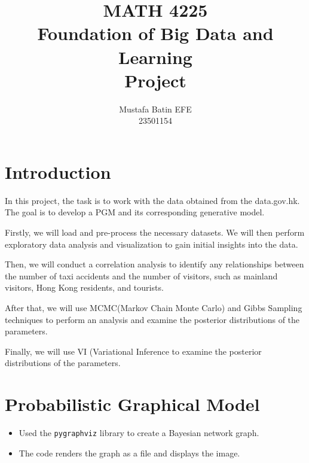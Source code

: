 \documentclass{article}
\begin{document}
\title{MATH 4225  \\Foundation of Big Data and Learning\\ Project}
\author{Mustafa Batin EFE\\23501154}
\maketitle
\newpage

\section{Introduction}

In this project, the task is to work with the data obtained from the data.gov.hk. The goal is to develop a PGM and its corresponding generative model.

Firstly, we will load and pre-process the necessary datasets. We will then perform exploratory data analysis and visualization to gain initial insights into the data.

Then, we will conduct a correlation analysis to identify any relationships between the number of taxi accidents and the number of visitors, such as mainland visitors, Hong Kong residents, and tourists. 

After that, we will use MCMC(Markov Chain Monte Carlo) and Gibbs Sampling techniques to perform an analysis and examine the posterior distributions of the parameters. 

Finally, we will use VI (Variational Inference to examine the posterior distributions of the parameters.

\section{Probabilistic Graphical Model}

\begin{itemize}
  \item Used the \texttt{pygraphviz} library to create a Bayesian network graph.
  \item The code renders the graph as a file and displays the image.

  \begin{center}
  \end{center}

\end{itemize}
\end{document}
